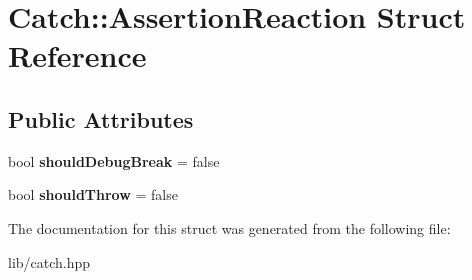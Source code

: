 \hypertarget{struct_catch_1_1_assertion_reaction}{}\section{Catch\+:\+:Assertion\+Reaction Struct Reference}
\label{struct_catch_1_1_assertion_reaction}
\subsection*{Public Attributes}
\begin{DoxyCompactItemize}
\item 
\mbox{\label{struct_catch_1_1_assertion_reaction_adcf30fb90ff20d9789df78d424652497}} 
bool {\bfseries should\+Debug\+Break} = false
\item 
\mbox{\label{struct_catch_1_1_assertion_reaction_a82c8d95a2c1b6a331bde66982a8e090f}} 
bool {\bfseries should\+Throw} = false
\end{DoxyCompactItemize}


The documentation for this struct was generated from the following file\+:\begin{DoxyCompactItemize}
\item 
lib/catch.\+hpp\end{DoxyCompactItemize}
